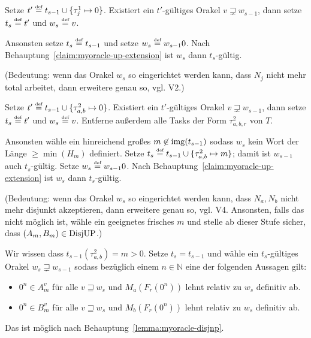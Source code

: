 \begin{description}[leftmargin=\parindent]
    \item[Task $\tau^1_j$:] Setze $t'\stackrel{\text{{\normalfont\tiny def}}}{=} t_{s-1}\cup\{\tau^1_j\mapsto 0\}$. Existiert ein $t'$-gültiges Orakel $v\sqsupsetneq w_{s-1}$, dann setze $t_s\stackrel{\text{{\normalfont\tiny def}}}{=} t'$ und $w_s\stackrel{\text{{\normalfont\tiny def}}}{=} v$.

        Ansonsten setze $t_s\stackrel{\text{{\normalfont\tiny def}}}{=} t_{s-1}$ und setze $w_s\stackrel{\text{{\normalfont\tiny def}}}{=} w_{s-1}0$. Nach Behauptung~\ref{claim:myoracle-up-extension} ist $w_s$ dann $t_s$-gültig.

        (Bedeutung: wenn das Orakel $w_s$ so eingerichtet werden kann, dass $N_j$ nicht mehr total arbeitet, dann erweitere genau so, vgl. V2.) 

    \item[Task $\tau^2_{a,b}$:] Setze $t'\stackrel{\text{{\normalfont\tiny def}}}{=} t_{s-1}\cup\{\tau^2_{a,b}\mapsto 0\}$. Existiert ein $t'$-gültiges Orakel $v\sqsupsetneq w_{s-1}$, dann setze $t_s\stackrel{\text{{\normalfont\tiny def}}}{=} t'$ und $w_s\stackrel{\text{{\normalfont\tiny def}}}{=} v$. Entferne außerdem alle Tasks der Form $\tau^2_{a,b,r}$ von $T$.

        Ansonsten wähle ein hinreichend großes $m\not\in \operatorname{img}(t_{s-1})$ sodass $w_s$ kein Wort der Länge $\geq\min(H_m)$ definiert. Setze $t_s\stackrel{\text{{\normalfont\tiny def}}}{=} t_{s-1}\cup \{ \tau^2_{a,b}\mapsto m \}$; damit ist $w_{s-1}$ auch $t_s$-gültig. Setze $w_s\stackrel{\text{{\normalfont\tiny def}}}{=} w_{s-1}0$. Nach Behauptung~\ref{claim:myoracle-up-extension} ist $w_s$ dann $t_s$-gültig.

        (Bedeutung: wenn das Orakel $w_s$ so eingerichtet werden kann, dass $N_a, N_b$ nicht mehr disjunkt akzeptieren, dann erweitere genau so, vgl. V4. Ansonsten, falls das nicht möglich ist, wähle ein geeignetes frisches $m$ und stelle ab dieser Stufe sicher, dass $(A_m, B_m)\in \mathrm{DisjUP}$.) 

    \item[Task $\tau^2_{a,b,r}$:] Wir wissen dass $t_{s-1}(\tau^2_{a,b})=m>0$. Setze $t_s=t_{s-1}$ und wähle ein $t_s$-gültiges Orakel $w_s\sqsupsetneq w_{s-1}$ sodass bezüglich einem $n\in\mathbb N$ eine der folgenden Aussagen gilt:
        \begin{itemize}[nosep,endpenalty=10000]
            \item $0^n\in A_m^v$ für alle $v\sqsupseteq w_s$ und $M_a(F_r(0^n))$ lehnt relativ zu $w_s$ definitiv ab.
            \item $0^n\in B_m^v$ für alle $v\sqsupseteq w_s$ und $M_b(F_r(0^n))$ lehnt relativ zu $w_s$ definitiv ab.
        \end{itemize} Das ist möglich nach Behauptung~\ref{lemma:myoracle-disjnp}.


\end{description}
